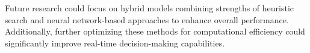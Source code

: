 \documentclass[journal, a4paper]{IEEEtran}
\begin{document}
Future research could focus on hybrid models combining strengths of heuristic search and neural network-based approaches to enhance overall performance. Additionally, further optimizing these methods for computational efficiency could significantly improve real-time decision-making capabilities.


\newpage



\newpage




\end{document}
